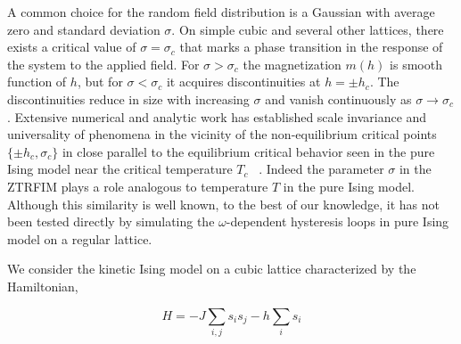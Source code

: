 \documentclass[a4,aps,amsmath,floatfix,nofootinbib,10pt]{revtex4}
\newcommand{\bdm}{\begin{displaymath}}
\newcommand{\edm}{\end{displaymath}}
\begin{document}
A common choice for the random field distribution is a Gaussian with 
average zero and standard deviation $\sigma$. On simple cubic and 
several other lattices, there exists a critical value of 
$\sigma=\sigma_c$ that marks a phase transition in the response of the 
system to the applied field. For $\sigma > \sigma_c$ the magnetization 
$m(h)$ is smooth function of $h$, but for $\sigma < \sigma_c$ it 
acquires discontinuities at $h=\pm h_c$. The discontinuities reduce in 
size with increasing $\sigma$ and vanish continuously as $\sigma \to 
\sigma_c$. Extensive numerical and analytic work has established scale 
invariance and universality of phenomena in the vicinity of the 
non-equilibrium critical points $\{\pm h_c,\sigma_c\}$ in close parallel 
to the equilibrium critical behavior seen in the pure Ising model near 
the critical temperature $T_c$ ~\cite{wilson}. Indeed the parameter 
$\sigma$ in the ZTRFIM plays a role analogous to temperature $T$ in the 
pure Ising model. Although this similarity is well known, to the best 
of our knowledge, it has not been tested directly by simulating the 
$\omega$-dependent hysteresis loops in pure Ising model on a regular 
lattice.

We consider the kinetic Ising model on a cubic lattice characterized by 
the Hamiltonian,

\bdm H=-J\sum_{i,j}s_i s_j-h\sum_i s_i \edm
\end{document}
